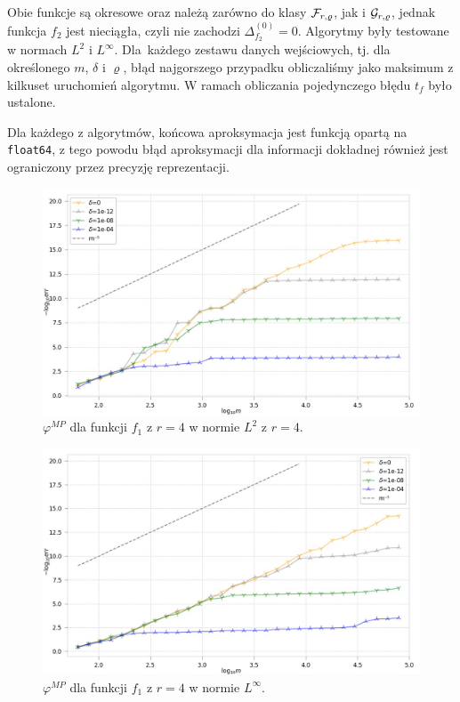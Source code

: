 \documentclass[oik, pdftex, man]{mgrwms}
\begin{document}
    Obie funkcje są okresowe oraz należą zarówno do klasy $\mathcal{F}_{r, \varrho}$, jak i $\mathcal{G}_{r,\varrho}$, jednak funkcja $f_{2}$ jest nieciągła, czyli nie zachodzi $\Delta_{f_{2}}^{(0)} = 0$. Algorytmy były testowane w normach $L^{2}$ i $L^{\infty}$. Dla~każdego zestawu danych wejściowych, tj. dla określonego $m$, $\delta$ i $\varrho$, błąd najgorszego przypadku obliczaliśmy jako maksimum z kilkuset uruchomień algorytmu. W ramach obliczania pojedynczego błędu $t_{f}$ było ustalone.

    Dla każdego z algorytmów, końcowa aproksymacja jest funkcją opartą na \verb+float64+, z tego powodu błąd aproksymacji dla informacji dokładnej również jest ograniczony przez precyzję reprezentacji.

    \begin{figure}
        \centering
        \includegraphics[width=.9\linewidth]{alg2015/f_1/r_4/p_2/plot_30evaluation_0.jpg}
        \caption{$\varphi^{MP}$ dla funkcji $f_{1}$ z $r=4$ w normie $L^{2}$ z $r=4$.}
        \label{rys:1:algMP_p2}
    \end{figure}

    \begin{figure}
        \centering
        \includegraphics[width=.9\linewidth]{alg2015/f_1/r_4/p_infinity/plot_30evaluation_0.jpg}
        \caption{$\varphi^{MP}$ dla funkcji $f_{1}$ z $r=4$ w normie $L^{\infty}$.}
        \label{rys:2:algMP_pInf}
    \end{figure}
    
\end{document}
